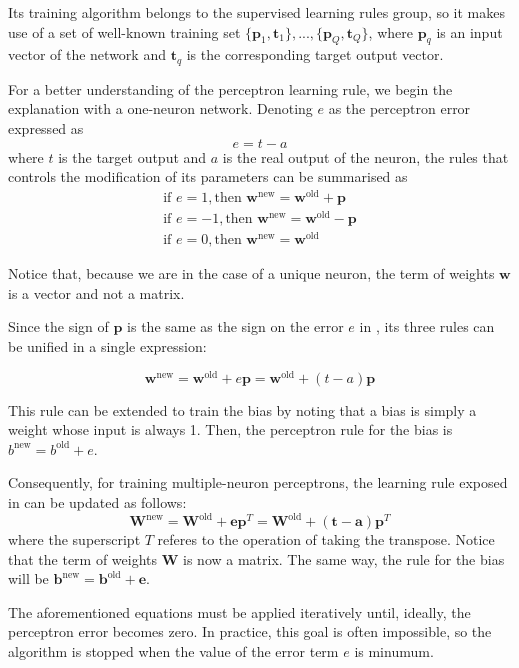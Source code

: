 Its training algorithm belongs to the supervised learning rules group, 
so it makes use of a set of well-known training set $\{\mathbf{p}_1,\mathbf{t}_1\}, ... , \{\mathbf{p}_Q,\mathbf{t}_Q\}$, where $\mathbf{p}_q$ is an input vector of the network and $\mathbf{t}_q$ is the corresponding target output vector. 

For a better understanding of the perceptron learning rule, 
we begin the explanation with a one-neuron network. 
Denoting $e$ as the perceptron error expressed as
\begin{equation}
e=t-a
\end{equation}
where $t$ is the target output and $a$ is the real output of the neuron, the rules that controls the modification of its parameters can be summarised as \cite{Demuth:2014:NND:2721661}
\begin{equation}
\begin{align*}
\text{if } e=1,
\text{then } \mathbf{w}^{\text{new}} = \mathbf{w}^{\text{old}}+\mathbf{p}\\
\text{if } e=-1,
\text{then } \mathbf{w}^{\text{new}} = \mathbf{w}^{\text{old}}-\mathbf{p}\\
\text{if } e=0,
\text{then } \mathbf{w}^{\text{new}} = \mathbf{w}^{\text{old}}
\end{align*}
\label{eq:perceptron3rules}
\end{equation}

Notice that, because we are in the case of a unique neuron, the term of weights $\mathbf{w}$ is a vector and not a matrix. 

Since the sign of $\mathbf{p}$ is the same as the sign on the error $e$ in , its three rules can be unified in a single expression:

\begin{equation}
\mathbf{w}^{\text{new}} = \mathbf{w}^{\text{old}}+e\mathbf{p} = \mathbf{w}^{\text{old}}+(t-a)\mathbf{p}
\label{eq:perceptron1rule}
\end{equation}

This rule can be extended to train the bias by noting that a bias is simply a weight whose input is always 1.
Then, the perceptron rule for the bias is 
$b^{\text{new}}=b^{\text{old}}+e$.

Consequently, for training multiple-neuron perceptrons, the learning rule exposed in  can be updated as follows:
\begin{equation}
\mathbf{W}^{\text{new}} = \mathbf{W}^{\text{old}}+\mathbf{e}\mathbf{p}^{T} = \mathbf{W}^{\text{old}}+(\mathbf{t}-\mathbf{a})\mathbf{p}^{T}
\label{eq:perceptron1rule}
\end{equation}
where the superscript $T$ referes to the operation of taking the transpose. Notice that the term of weights $\mathbf{W}$ is now a matrix. The same way, the rule for the bias will be $\mathbf{b}^{\text{new}}=\mathbf{b}^{\text{old}}+\mathbf{e}$.

The aforementioned equations must be applied iteratively until, ideally, the perceptron error becomes zero. In practice, this goal is often impossible, so the algorithm is stopped when the value of the error term $e$ is minumum.




